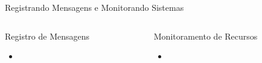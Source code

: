 \documentclass[10pt, compress, aspectratio=169, xcolor={table,usenames,dvipsnames}]{beamer}
\begin{document}
\begin{frame}[label={sec:org12edfca},t,fragile]{Registrando Mensagens e Monitorando Sistemas}
\begin{columns}
\begin{column}{0.5\columnwidth}
\begin{block}{Registro de Mensagens}
{\rmfamily

\begin{itemize}
\item
\end{itemize}

}
\end{block}
\end{column}
\begin{column}{0.5\columnwidth}
\begin{block}{Monitoramento de Recursos}
{\rmfamily

\begin{itemize}
\item
\end{itemize}

}
\end{block}
\end{column}
\end{columns}
\end{frame}
\end{document}
